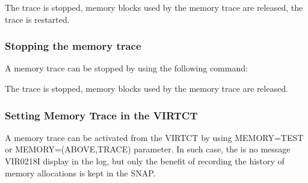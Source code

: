 \documentclass[letterpaper,10pt,english]{sphinxmanual}
\begin{document}
\begin{sphinxVerbatim}[commandchars=\\\{\}]
\end{sphinxVerbatim}

\sphinxAtStartPar
The trace is stopped, memory blocks used by the memory trace are released, the trace is restarted.

\begin{sphinxVerbatim}[commandchars=\\\{\}]
 
          
   
   
   
          
\end{sphinxVerbatim}


\subsubsection{Stopping the memory trace}
\label{\detokenize{audit_operations_ and_performance:stopping-the-memory-trace}}
\sphinxAtStartPar
A memory trace can be stopped by using the following command:\sphinxhyphen{}

\begin{sphinxVerbatim}[commandchars=\\\{\}]
\end{sphinxVerbatim}

\sphinxAtStartPar
The trace is stopped, memory blocks used by the memory trace are released.


\subsubsection{Setting Memory Trace in the VIRTCT}
\label{\detokenize{audit_operations_ and_performance:setting-memory-trace-in-the-virtct}}
\sphinxAtStartPar
A memory trace can be activated from the VIRTCT by using MEMORY=TEST or MEMORY=(ABOVE,TRACE) parameter. In such case, the is no message VIR0218I display in the log, but only the benefit of recording the history of memory allocations is kept in the SNAP.
\end{document}
